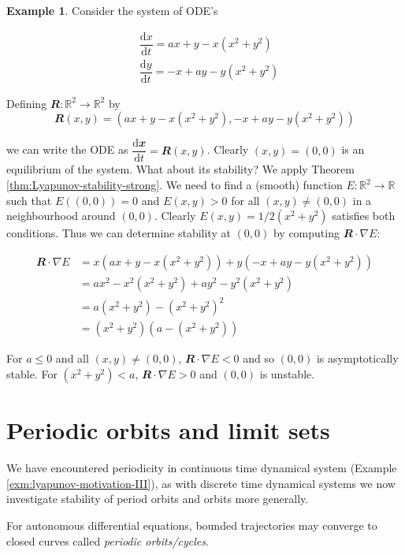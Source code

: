 \documentclass[
  a4paper,
  oneside,
  final]{krantz}
\newcommand{\R}{\mathbb{R}}
\renewcommand{\d}{\mathrm{d}}
\renewcommand{\v}[1]{{\mathbfit{#1}}}
\newcommand{\der}[2]{\dfrac{\d #1}{\d #2}}
\theoremstyle{definition}
\theoremstyle{definition}
\newtheorem{example}{Example}[chapter]
\theoremstyle{definition}
\theoremstyle{definition}
\theoremstyle{remark}
\begin{document}
\begin{example}
Consider the system of ODE's

\begin{align*}
 & \der{x}{t} = a x + y -x(x^2 +y^2) \\
 & \der{y}{t} = -x + ay -y(x^2 + y^2)
\end{align*}

Defining \(\v{R}: \R^2 \to \R^2\) by
\[\v{R}(x,y) = (a x + y -x(x^2 +y^2), -x + ay -y(x^2 +y^2))\]

we can write the ODE as \(\der{\v{x}}{t} = \v{R}(x,y)\). Clearly \((x,y) = (0,0)\) is an equilibrium of the system. What about its stability? We apply Theorem \ref{thm:Lyapunov-stability-strong}. We need to find a (smooth) function \(E: \R^2 \to \R\) such that \(E((0,0)) = 0\) and \(E(x,y)>0\) for all \((x,y) \ne (0,0)\) in a neighbourhood around \((0,0)\). Clearly \(E(x,y) = 1/2(x^2 + y^2)\) satisfies both conditions.
Thus we can determine stability at \((0,0)\) by computing \(\v{R} \cdot \nabla E\):

\begin{align*}
 \v{R} \cdot \nabla E &= x (a x + y -x(x^2 +y^2)) + y (-x + ay -y(x^2 + y^2)) \\
                      &= ax^2  - x^2 (x^2 + y^2) + ay^2 - y^2(x^2 + y^2) \\
                      &= a(x^2 + y^2) - (x^2 + y^2)^2 \\
                      &= (x^2 + y^2) (a - (x^2 + y^2)) 
\end{align*}

For \(a \le 0\) and all \((x,y) \ne (0,0)\), \(\v{R} \cdot \nabla E <0\) and so \((0,0)\) is asymptotically stable. For \((x^2 + y^2)< a\), \(\v{R} \cdot \nabla E >0\) and \((0,0)\) is unstable.
\end{example}

\hypertarget{periodic-orbits-and-limit-sets}{%
\section{Periodic orbits and limit sets}\label{periodic-orbits-and-limit-sets}}

We have encountered periodicity in continuous time dynamical system (Example \ref{exm:lyapunov-motivation-III}), as with discrete time dynamical systems we now investigate stability of period orbits and orbits more generally.

For autonomous differential equations, bounded trajectories may converge to closed curves called \emph{periodic orbits/cycles}.
\end{document}
